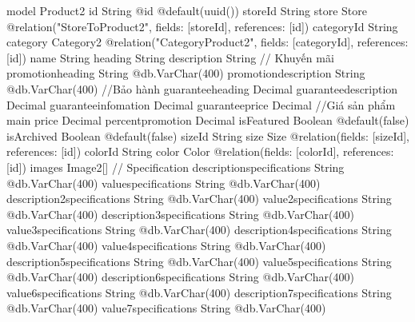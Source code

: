 model Product2 {
  id                           String                         @id @default(uuid())
  storeId                      String
  store                        Store                          @relation("StoreToProduct2", fields: [storeId], references: [id])
  categoryId                   String
  category                     Category2                      @relation("CategoryProduct2", fields: [categoryId], references: [id])
  name                         String
  heading                      String
  description                  String
  // Khuyến mãi
  promotionheading             String                         @db.VarChar(400)
  promotiondescription         String                         @db.VarChar(400)
  //Bảo hành
  guaranteeheading             Decimal
  guaranteedescription         Decimal
  guaranteeinfomation          Decimal
  guaranteeprice               Decimal
  //Giá sản phẩm main
  price                        Decimal
  percentpromotion             Decimal
  isFeatured                   Boolean                        @default(false)
  isArchived                   Boolean                        @default(false)
  sizeId                       String
  size                         Size                           @relation(fields: [sizeId], references: [id])
  colorId                      String
  color                        Color                          @relation(fields: [colorId], references: [id])
  images                       Image2[]
  // Specification
  descriptionspecifications    String                         @db.VarChar(400)
  valuespecifications          String                         @db.VarChar(400)
  description2specifications   String                         @db.VarChar(400)
  value2specifications         String                         @db.VarChar(400)
  description3specifications   String                         @db.VarChar(400)
  value3specifications         String                         @db.VarChar(400)
  description4specifications   String                         @db.VarChar(400)
  value4specifications         String                         @db.VarChar(400)
  description5specifications   String                         @db.VarChar(400)
  value5specifications         String                         @db.VarChar(400)
  description6specifications   String                         @db.VarChar(400)
  value6specifications         String                         @db.VarChar(400)
  description7specifications   String                         @db.VarChar(400)
  value7specifications         String                         @db.VarChar(400)
}
